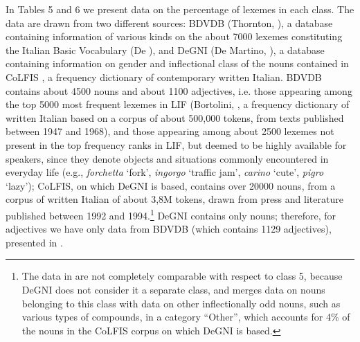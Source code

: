 \documentclass[output=paper]{langscibook}
\begin{document}
In Tables 5 and 6 we present data on the percentage of lexemes in each class. The data are drawn from two different sources: BDVDB (Thornton, \citealt{IacobiniBurani1997}), a database containing information of various kinds on the about 7000 lexemes constituting the Italian Basic Vocabulary (De \citealt{Mauro1989}), and DeGNI (De Martino, \citealt{BraccoLaudanna2023}), a database containing information on gender and inflectional class of the nouns contained in CoLFIS \citep{BertinettoEtAl2005}, a frequency dictionary of contemporary written Italian. BDVDB contains about 4500 nouns and about 1100 adjectives, i.e. those appearing among the top 5000 most frequent lexemes in LIF (Bortolini, \citealt{TagliaviniZampolli1971}, a frequency dictionary of written Italian based on a corpus of about 500,000 tokens, from texts published between 1947 and 1968), and those appearing among about 2500 lexemes not present in the top frequency ranks in LIF, but deemed to be highly available for speakers, since they denote objects and situations commonly encountered in everyday life (e.g., \textit{forchetta} ‘fork’, \textit{ingorgo} ‘traffic jam’, \textit{carino} ‘cute’, \textit{pigro} ‘lazy’); CoLFIS, on which DeGNI is based, contains over 20000 nouns, from a corpus of written Italian of about 3,8M tokens, drawn from press and literature published between 1992 and 1994.\footnote{The data in  are not completely comparable with respect to class 5, because DeGNI does not consider it a separate class, and merges data on nouns belonging to this class with data on other inflectionally odd nouns, such as various types of compounds, in a category “Other”, which accounts for 4\% of the nouns in the CoLFIS corpus on which DeGNI is based.}  DeGNI contains only nouns; therefore, for adjectives we have only data from BDVDB (which contains 1129 adjectives), presented in .

\begin{table}
\caption{Percentage of nouns in each inflectional class (types)}
\label{tab:key:5}
\end{table}
\end{document}
